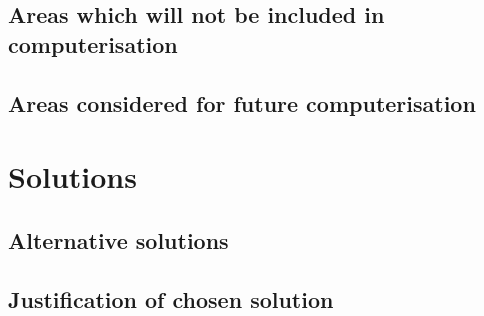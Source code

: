 \subsection{Areas which will not be included in computerisation}

\subsection{Areas considered for future computerisation}

\section{Solutions}

\subsection{Alternative solutions}

\subsection{Justification of chosen solution}

